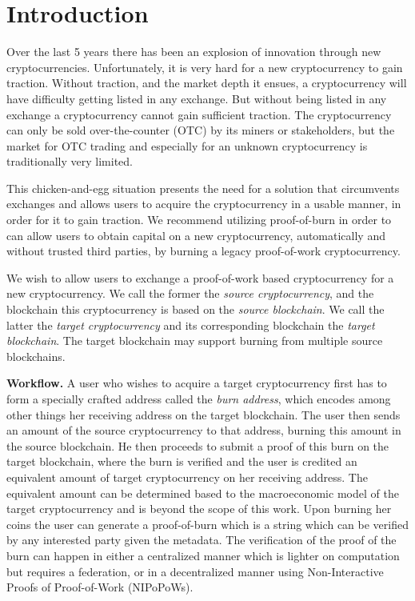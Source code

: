 \section{Introduction}\label{section:introduction}

Over the last 5 years there has been an explosion of innovation through new cryptocurrencies. Unfortunately, it is very hard for a new cryptocurrency to gain traction. Without traction, and the market depth it ensues, a cryptocurrency will have difficulty getting listed in any exchange. But without being listed in any exchange a cryptocurrency cannot gain sufficient traction. The cryptocurrency can only be sold over-the-counter (OTC) by its miners or stakeholders, but the market for OTC trading and especially for an unknown cryptocurrency is traditionally very limited.

This chicken-and-egg situation presents the need for a solution that circumvents exchanges and allows users to acquire the cryptocurrency in a usable manner, in order for it to gain traction. We recommend utilizing proof-of-burn in order to can allow users to obtain capital on a new cryptocurrency, automatically and without trusted third parties, by burning a legacy proof-of-work cryptocurrency.

We wish to allow users to exchange a proof-of-work based cryptocurrency for a new cryptocurrency. We call the former the \emph{source cryptocurrency}, and the blockchain this cryptocurrency is based on the \emph{source blockchain}. We call the latter the \emph{target cryptocurrency} and its corresponding blockchain the \emph{target blockchain}. The target blockchain may support burning from multiple source blockchains.

\noindent
\textbf{Workflow.}
A user who wishes to acquire a target cryptocurrency first has to form a specially crafted address called the \emph{burn address}, which encodes among other things her receiving address on the target blockchain. The user then sends an amount of the source cryptocurrency to that address, burning this amount in the source blockchain. He then proceeds to submit a proof of this burn on the target blockchain, where the burn is verified and the user is credited an equivalent amount of target cryptocurrency on her receiving address. The equivalent amount can be determined based to the macroeconomic model of the target cryptocurrency and is beyond the scope of this work. Upon burning her coins the user can generate a proof-of-burn which is a string which can be verified by any interested party given the metadata. The verification of the proof of the burn can happen in either a centralized manner which is lighter on computation but requires a federation, or in a decentralized manner using Non-Interactive Proofs of Proof-of-Work (NIPoPoWs).

